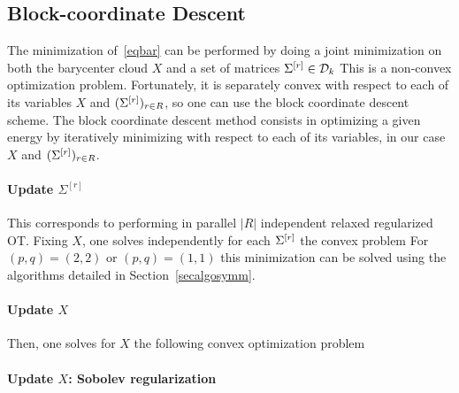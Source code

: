 \subsection{Block-coordinate Descent}\label{algobar}

The minimization of~\eqref{eqbar} can be performed by doing a joint minimization on both the barycenter cloud $X$ and a set of matrices $\Sigma^{[r]} \in \mathcal{D}_k$ 
This is a non-convex optimization problem. Fortunately, it is separately convex with respect to each of its variables $X$ and $( \Sigma^{[r]} )_{r \in R}$, so one can use the block coordinate descent scheme. The block coordinate descent method consists in optimizing a given energy by iteratively minimizing with respect to each of its variables, in our case $X$ and  $( \Sigma^{[r]} )_{r \in R}$.


\paragraph{Update $\Sigma^{[r]}$}

This corresponds to performing in parallel $|R|$ independent relaxed regularized OT. Fixing $X$, one solves independently for each $\Sigma^{[r]}$ the convex problem
For $(p,q)=(2,2)$ or $(p,q)=(1,1)$ this minimization can be solved using the algorithms detailed in Section~\ref{secalgosymm}.


\paragraph{Update $X$} 

Then, one solves for $X$ the following convex optimization problem

\paragraph{Update $X$: Sobolev regularization} \label{algobarysobolev}

